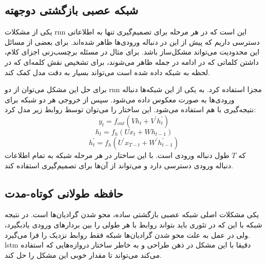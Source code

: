 \subsection{شبکه عصبی بازگشتی دوجهته}
یکی از مشکلات \gls{rnn} این است که در هر مرحله برای تصمیم‌گیری تنها به اطلاعاتی
دسترسی داریم که پیش از این در دنباله ورودی‌ها ظاهر شده‌اند. برای بعضی از مسائل
این محدودیت می‌تواند مشکل‌ساز باشد. برای مثال در مسئله برچسب‌زنی اجزای کلام،
داشتن کلماتی که در ادامه در جمله ظاهر می‌شوند، برای تشخیص نقش کلمه‌ای که در لحظه
به شبکه داده شده است می‌تواند بسیار به دقت مدل کمک کند.

برای حل این مشکل می‌توان از دو \gls{rnn} مجزا استفاده کرد. به یکی از این شبکه‌ها
دنباله ورودی‌ها به صورت معکوس داده می‌شود. سپس از خروجی هر دو شبکه برای
نتیجه‌گیری با هم استفاده می‌شود. این ساختار را می‌توان توسط روابط زیر مدل کرد:
\begin{equation}
    y_t = f_{out}(Vh_t + V^\prime h_t^\prime)
\end{equation}
\begin{equation}
    h_t = f_h(Ux_t + Wh_{t-1})
\end{equation}
\begin{equation}
    h_t^\prime = f_h(U^\prime x_{T - t} + W^\prime h_{t-1}^\prime)
\end{equation}
که $T$ طول دنباله ورودی است. با این ساختار در هر مرحله شبکه به تمام اطلاعات
دنباله ورودی دسترسی دارد و می‌تواند از آن‌ها برای تصمیم‌گیری استفاده کند.

\subsection{حافظه طولانی کوتاه-مدت}
یکی مشکلات اصلی شبکه عصبی بازگشتی ساده، محو شدن گرادیان‌ها است. در نتیجه شبکه با
این که در تئوری باید بتواند روابط با هر طولی را بین بردارهای ورودی یادبگیرد، ولی
در عمل به علت محو شدن گرادیان‌ها شبکه فقط روابط نزدیک را فرا می‌گیرد. \gls{lstm}
دقیقا با این مشکل در ذهن طراحی و به خاطر ساختار دروازه‌هایی که استفاده می‌کند
می‌تواند تا مقدار خوبی این مشکل را حل کند.

